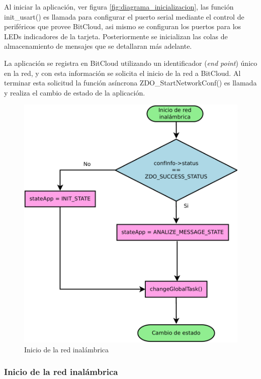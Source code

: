 Al iniciar la aplicación, ver figura \ref{fig:diagrama_inicializacion}, las función init\_usart() es llamada para configurar el puerto serial mediante el control de periféricos que provee BitCloud, asi mismo se configuran los puertos para los LEDs indicadores de la tarjeta. Posteriormente se inicializan las colas de almacenamiento de mensajes que se detallaran más adelante. 

La aplicación se registra en BitCloud utilizando un identificador (\textit{end point}) único en la red, y con esta información se solicita el inicio de la red a BitCloud. Al terminar esta solicitud la función asíncrona ZDO\_StartNetworkConf() es llamada y realiza el cambio de estado de la aplicación. 

\begin{figure}
	\centering
	\includegraphics[scale=0.35]{capitulo_3_imgs/inicio_red.pdf}
	\caption{Inicio de la red inalámbrica}
	\label{fig:diagrama_inicio_red}
\end{figure}

\subsubsection{Inicio de la red inalámbrica}


